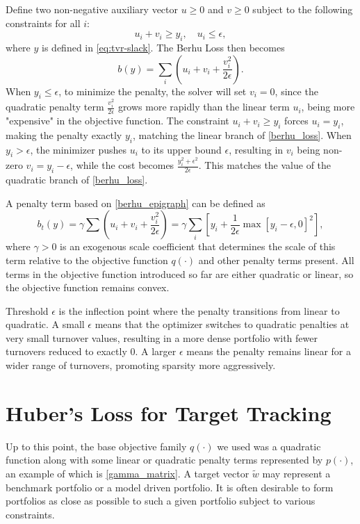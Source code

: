 \documentclass[11pt, letterpaper]{article}
\begin{document}
Define two non-negative auxiliary vector $u \geq 0$ and $v \geq 0$ subject to the following constraints for all $i$:
\begin{equation*}
	u_i + v_i \geq y_i, \quad u_i \leq \epsilon,
\end{equation*}
where $y$ is defined in \eqref{eq:tvr-slack}. The Berhu Loss then becomes
\begin{equation}
    \label{berhu_epigraph}
	b(y) = \sum_i \left(u_i + v_i + \frac{v_i^2}{2\epsilon}\right).
\end{equation}
When $y_i \leq \epsilon$, to minimize the penalty, the solver will set $v_i = 0$, since the quadratic penalty term
$\frac{v_i^2}{2\epsilon}$ grows more rapidly than the linear term $u_i$, being more "expensive" in the objective function. The
constraint $u_i + v_i \geq y_i$ forces $u_i = y_i$, making the penalty exactly $y_i$, matching the linear branch of
\eqref{berhu_loss}. When $y_i > \epsilon$, the minimizer pushes $u_i$ to its upper bound $\epsilon$, resulting in $v_i$ being
non-zero $v_i = y_i - \epsilon$, while the cost becomes $\frac{y_i^2 + \epsilon ^ 2}{2\epsilon}$. This matches the value of the
quadratic branch of \eqref{berhu_loss}.

A penalty term based on \eqref{berhu_epigraph} can be defined as
\begin{equation}
	b_t(y) = \gamma \sum \left(u_i + v_i + \frac{v_i^2}{2\epsilon}\right) = \gamma \sum_i{\left[y_i + \frac{1}{2\epsilon}\max[y_i - \epsilon, 0]^2\right]},
\end{equation}
where $\gamma > 0$ is an exogenous scale coefficient that determines the scale of this term relative to the objective function
$q(\cdot)$ and other penalty terms present. All terms in the objective function introduced so far are either quadratic or
linear, so the objective function remains convex.

Threshold $\epsilon$ is the inflection point where the penalty transitions from linear to quadratic. A small $\epsilon$ means
that the optimizer switches to quadratic penalties at very small turnover values, resulting in a more dense portfolio with fewer
turnovers reduced to exactly $0$.  A larger $\epsilon$ means the penalty remains linear for a wider range of turnovers, promoting
sparsity more aggressively.


\section{Huber's Loss for Target Tracking}
\label{sec:huber_loss}
Up to this point, the base objective family $q(\cdot)$ we used was a quadratic function along with some linear or quadratic penalty
terms represented by $p(\cdot)$, an example of which is \eqref{gamma_matrix}. A target vector $\tilde{w}$ may represent a benchmark
portfolio or a model driven portfolio. It is often desirable to form portfolios as close as possible to such a given portfolio
subject to various constraints.
\end{document}
